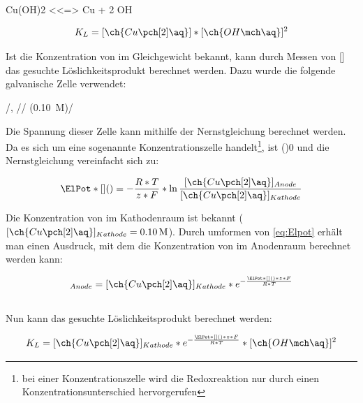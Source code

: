 \documentclass{article}
\begin{document}
      \begin{reaction}
        Cu(OH)2\sld{} <<=> Cu\pch[2]\aq{} + 2 OH\mch\aq{} \label{rec:LosungCUOH}      
      \end{reaction}
      
      \begin{equation}
        K_{L} = [\ch{Cu\pch[2]\aq}] * [\ch{OH\mch\aq}]^2 \label{eq:Loslichkeitprodukt}
      \end{equation}
      
      Ist  die Konzentration von  im Gleichgewicht bekannt, kann durch Messen von [] das gesuchte Löslichkeitsprodukt berechnet werden. Dazu wurde die folgende galvanische Zelle verwendet:
      
      \begin{center}
        /, //  (\SI[mode=text]{0.10}{M})/
      \end{center}
      
      Die Spannung dieser Zelle kann mithilfe der Nernstgleichung berechnet werden. Da es sich um eine sogenannte Konzentrationszelle handelt\footnote{bei einer Konzentrationszelle wird die Redoxreaktion nur durch einen Konzentrationsunterschied hervorgerufen}, ist \ElPot[superscript=0](){0} und die Nernstgleichung vereinfacht sich zu:
      
      \begin{equation}
        \ElPot*[](){} = - \frac{R * T}{z * F} * \ln \frac{[\ch{Cu\pch[2]\aq}]_{Anode}}{[\ch{Cu\pch[2]\aq}]_{Kathode}} \label{eq:Elpot}
      \end{equation}
      
      Die Konzentration von  im Kathodenraum ist bekannt ($[\ch{Cu\pch[2]\aq}]_{Kathode} = \SI[mode=text]{0.10}{M}$). Durch umformen von \ref{eq:Elpot} erhält man einen Ausdruck, mit dem die Konzentration von  im Anodenraum berechnet werden kann:
      
      \begin{equation}
        [\ch{Cu\pch[2]\aq}]_{Anode} = [\ch{Cu\pch[2]\aq}]_{Kathode} * e^{- \frac{\ElPot*[](){} * z * F}{R * T}} 
      \end{equation} \\
      
      Nun kann das gesuchte Löslichkeitsprodukt berechnet werden:
      
      \begin{equation}
        K_{L} = [\ch{Cu\pch[2]\aq}]_{Kathode} * e^{- \frac{\ElPot*[](){} * z * F}{R * T}} * [\ch{OH\mch\aq}]^2 \label{eq:Loslichkeitsproduktfinale}
      \end{equation}
      
\end{document}
